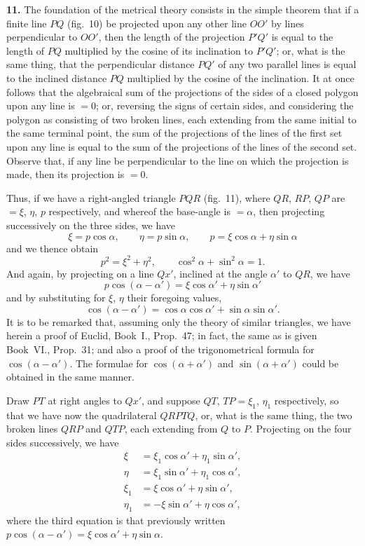 \documentclass[11pt,a4paper]{book}
\begin{document}
\textbf{11.} The foundation of the metrical theory consists in the simple theorem that if a finite line $PQ$ (fig.~10) be projected upon any other line $OO'$ by lines perpendicular to $OO'$, then the length of the projection $P'Q'$ is equal to the length of $PQ$ multiplied by the cosine of its inclination to $P'Q'$; or, what is the same thing, that the perpendicular distance $PQ'$ of any two parallel lines is equal to the inclined distance $PQ$ multiplied by the cosine of the inclination. It at once follows that the algebraical sum of the projections of the sides of a closed polygon upon any line is $=0$; or, reversing the signs of certain sides, and considering the polygon as consisting of two broken lines, each extending from the same initial to the same terminal point, the sum of the projections of the lines of the first set upon any line is equal to the sum of the projections of the lines of the second set. Observe that, if any line be perpendicular to the line on which the projection is made, then its projection is $=0$.

Thus, if we have a right-angled triangle $PQR$ (fig.~11), where $QR$, $RP$, $QP$ are $=\xi$, $\eta$, $p$ respectively, and whereof the base-angle is $=\alpha$, then projecting successively on the three sides, we have
\[
\xi = p\cos\alpha,\qquad \eta = p\sin\alpha,\qquad p = \xi\cos\alpha + \eta\sin\alpha
\]
and we thence obtain
\[
p^2 = \xi^2+\eta^2,\qquad \cos^2\alpha+\sin^2\alpha=1.
\]
And again, by projecting on a line $Qx'$, inclined at the angle $\alpha'$ to $QR$, we have
\[
p\cos(\alpha-\alpha') = \xi\cos\alpha' + \eta\sin\alpha'
\]
and by substituting for $\xi$, $\eta$ their foregoing values,
\[
\cos(\alpha-\alpha') = \cos\alpha\cos\alpha' + \sin\alpha\sin\alpha'.
\]
It is to be remarked that, assuming only the theory of similar triangles, we have herein a proof of Euclid, Book~I., Prop.~47; in fact, the same as is given Book~VI., Prop.~31; and also a proof of the trigonometrical formula for $\cos(\alpha-\alpha')$. The formulae for $\cos(\alpha+\alpha')$ and $\sin(\alpha+\alpha')$ could be obtained in the same manner.

Draw $PT$ at right angles to $Qx'$, and suppose $QT$, $TP=\xi_1$, $\eta_1$ respectively, so that we have now the quadrilateral $QRPTQ$, or, what is the same thing, the two broken lines $QRP$ and $QTP$, each extending from $Q$ to $P$. Projecting on the four sides successively, we have
\begin{align*}
\xi &= \xi_1\cos\alpha' + \eta_1\sin\alpha',\\
\eta &= \xi_1\sin\alpha' + \eta_1\cos\alpha',\\
\xi_1 &= \xi\cos\alpha' + \eta\sin\alpha',\\
\eta_1 &= -\xi\sin\alpha' + \eta\cos\alpha',
\end{align*}
where the third equation is that previously written $p\cos(\alpha-\alpha') = \xi\cos\alpha' + \eta\sin\alpha$.
\end{document}
